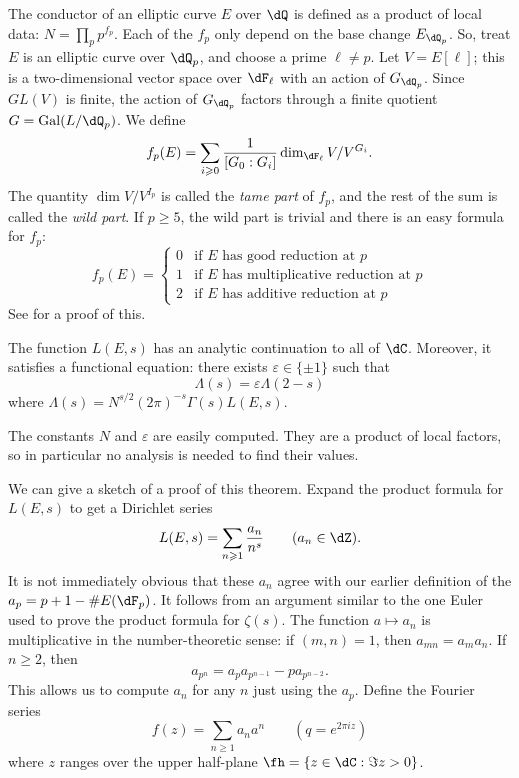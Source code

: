 \documentclass{article}
\begin{document}
The conductor of an elliptic curve $E$ over $\dQ$ is defined as a product of 
local data: $N = \prod_p p^{f_p}$. Each of the $f_p$ only depend on the base 
change $E_{\dQ_p}$. So, treat $E$ is an elliptic curve over $\dQ_p$, and 
choose a prime $\ell\ne p$. Let $V=E[\ell]$; this is a two-dimensional vector 
space over $\dF_\ell$ with an action of $G_{\dQ_p}$. Since $GL(V)$ is finite, 
the action of $G_{\dQ_p}$ factors through a finite quotient 
$G=\gal(L/\dQ_p)$. We define 
\[
  f_p(E) = \sum_{i\geqslant 0} \frac{1}{[G_0:G_i]} \dim_{\dF_\ell} V/V^{G_i} \text{.}
\]
The quantity $\dim V/V^{I_p}$ is called the \emph{tame part} of $f_p$, and the 
rest of the sum is called the \emph{wild part}. If $p\geqslant 5$, the wild 
part is trivial and there is an easy formula for $f_p$:
\[
  f_p(E) 
    = \begin{cases}
        0 & \text{if $E$ has good reduction at $p$} \\
        1 & \text{if $E$ has multiplicative reduction at $p$} \\
        2 & \text{if $E$ has additive reduction at $p$} 
      \end{cases}
\]
See \cite[IV.10.2]{si94} for a proof of this. 

\begin{theorem}
The function $L(E,s)$ has an analytic continuation to all of $\dC$. Moreover, 
it satisfies a functional equation: there exists $\varepsilon\in \{\pm 1\}$ such 
that 
\[
  \Lambda(s) = \varepsilon \Lambda(2-s)
\]
where $\Lambda(s) = N^{s/2} (2\pi)^{-s} \Gamma(s) L(E,s)$. 
\end{theorem}

The constants $N$ and $\varepsilon$ are easily computed. They are a product of 
local factors, so in particular no analysis is needed to find their values. 

We can give a sketch of a proof of this theorem. Expand the product formula for 
$L(E,s)$ to get a Dirichlet series 
\[
  L(E,s) = \sum_{n\geqslant 1} \frac{a_n}{n^s} \qquad (a_n\in \dZ) \text{.}
\]
It is not immediately obvious that these $a_n$ agree with our earlier 
definition of the $a_p=p+1-\# E(\dF_p)$. It follows from an argument similar to 
the one Euler used to prove the product formula for $\zeta(s)$. The function 
$a\mapsto a_n$ is multiplicative in the number-theoretic sense: if 
$(m,n)=1$, then $a_{mn}=a_m a_n$. If $n\geqslant 2$, then 
\[
  a_{p^n} = a_p a_{p^{n-1}} - p a_{p^{n-2}} \text{.}
\]
This allows us to compute $a_n$ for any $n$ just using the $a_p$. Define the 
Fourier series 
\[
  f(z) = \sum_{n\geqslant 1} a_n a^n \qquad (q=e^{2\pi i z})
\]
where $z$ ranges over the upper half-plane $\fh=\{z\in \dC:\Im z>0\}$. 
\end{document}
